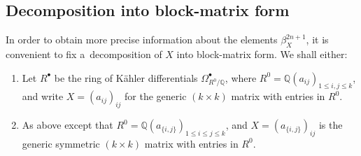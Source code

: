 \documentclass[pdftex]{sigma}%
\numberwithin{equation}{section}
\newcommand{\Q}{\mathbb Q}
\newcommand{\0}{\color{blue}{\mathsf{0}}}
\begin{document}
\subsection{Decomposition into block-matrix form} \label{sect: DecompBlockMatrix}
In order to obtain more precise information about the elements $\beta^{2n+1}_X$, it is convenient to fix a~decomposition of $X$ into block-matrix form. We shall either:
\begin{enumerate}\itemsep=0pt
\item Let $R^{\bullet}$ be the ring of K\"ahler differentials $\Omega^{\bullet}_{R^0/\Q}$, where $R^0=\Q(a_{ij})_{1\leq i,j\leq k}$,
and write $X=(a_{ij})_{ij}$ for the generic $(k\times k)$ matrix with entries in $R^0$.

\item As above except that $R^0 = \Q(a_{\{i,j\}})_{1\leq i\leq j\leq k}$,
and $X=(a_{\{i,j\}})_{ij}$ is the generic symmetric $(k\times k)$ matrix with entries in $R^0$.
\end{enumerate}
\end{document}
